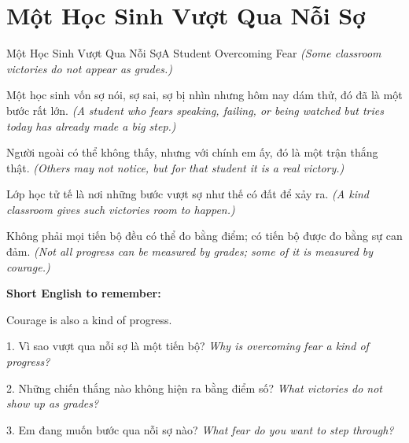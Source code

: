 \section{Một Học Sinh Vượt Qua Nỗi Sợ}
\begin{truyen}{Một Học Sinh Vượt Qua Nỗi Sợ}{A Student Overcoming Fear}
\textit{(Some classroom victories do not appear as grades.)}

Một học sinh vốn sợ nói, sợ sai, sợ bị nhìn nhưng hôm nay dám thử, đó đã là một bước rất lớn.
\textit{(A student who fears speaking, failing, or being watched but tries today has already made a big step.)}

Người ngoài có thể không thấy, nhưng với chính em ấy, đó là một trận thắng thật.
\textit{(Others may not notice, but for that student it is a real victory.)}

Lớp học tử tế là nơi những bước vượt sợ như thế có đất để xảy ra.
\textit{(A kind classroom gives such victories room to happen.)}
\end{truyen}

\begin{baihoc}
Không phải mọi tiến bộ đều có thể đo bằng điểm; có tiến bộ được đo bằng sự can đảm.
\textit{(Not all progress can be measured by grades; some of it is measured by courage.)}
\end{baihoc}

\begin{ghinhoanh}
\textbf{Short English to remember:}

Courage is also a kind of progress.

\end{ghinhoanh}

\begin{tuhocnhanh}
1. Vì sao vượt qua nỗi sợ là một tiến bộ? \textit{Why is overcoming fear a kind of progress?}

2. Những chiến thắng nào không hiện ra bằng điểm số? \textit{What victories do not show up as grades?}

3. Em đang muốn bước qua nỗi sợ nào? \textit{What fear do you want to step through?}
\end{tuhocnhanh}
\ngancach

